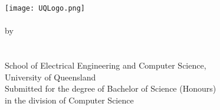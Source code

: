 \begin{titlepage}
	\begin{center}
		\texttt{[image: UQLogo.png]}\\
        \vfill
		\huge\textbf{\covertext}\\
        \vfill
		\large by\\
		\vspace{5mm}
		\Large\textbf{\authortext}\\
        \large \studentnotext \\
        \large {}
        \vfill
		\large School of Electrical Engineering and Computer Science,\\\smallskip
        \large University of Queensland\\
        \vfill
		\large Submitted for the degree of Bachelor of Science (Honours)\\\smallskip
        \large in the division of Computer Science
        \vfill
		\large \thesisduedate
	\end{center}
\end{titlepage}